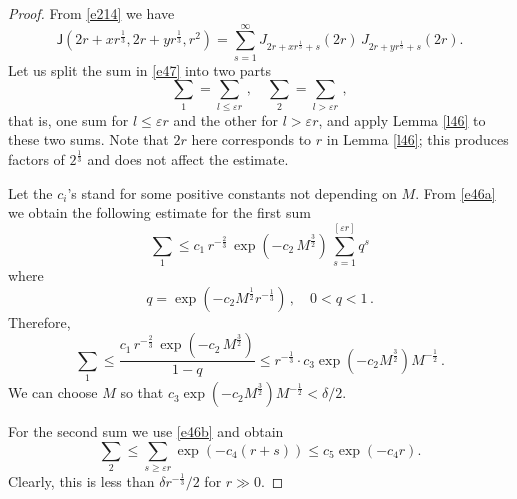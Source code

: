 \documentclass[12pt]{amsart}
\newcommand{\J}{\mathsf{J}}
\theoremstyle{plain}
\theoremstyle{definition}
\numberwithin{equation}{section}
\begin{document}
\begin{proof} From  \eqref{e214} we have 
%
\begin{equation}\label{e47}
\J\left(2r+xr^{\frac 13},2r+yr^{\frac 13}, {r^2} \right)=\sum_{s=1}^\infty 
J_{2r+xr^{\frac 13}+s}(2r)\,J_{2r+yr^{\frac 13}+s}(2r).
\end{equation}
%
Let us split the sum in \eqref{e47}  into two parts
%
\begin{equation*}
{\sum}_1=\sum_{l\le \varepsilon r}\,, \quad  
{\sum}_2=\sum_{l> \varepsilon r}\,,
\end{equation*}
%
that is, one sum for 
$l\le\varepsilon r$ and the other  for $l> \varepsilon r$, and apply
Lemma \ref{l46} to these two sums.  Note that $2r$ 
here corresponds to $r$ in Lemma \ref{l46};  this produces factors of 
$2^{\frac 13}$ and does not affect the estimate. 

Let the $c_i$'s stand for some positive constants not depending on 
$M$. From \eqref{e46a} we obtain the following estimate for the first sum 
$$
{\sum}_1 \le  c_1\, r^{-\frac 23}\,
\exp\left(-c_2\,M^{\frac 32}\right) \, \sum_{s=1}^{[\varepsilon r]} q^s 
$$
where
$$
q=\exp\left(-c_2M^{\frac 12}r^{-\frac 13}\right)\,, \quad 0<q<1\,.
$$
Therefore,
$$
{\sum}_1 \le \frac{c_1\, r^{-\frac 23}\,
\exp\left(-c_2\,M^{\frac 32}\right) }{1-q} \le 
r^{-\frac 13}\cdot c_3\exp(-c_2M^{\frac 32})M^{-\frac 12} \,.
$$
We can choose $M$ so that $c_3\exp(-c_2M^{\frac 32})M^{-\frac 12}<\delta/2$.

For  the second sum we use \eqref{e46b} and obtain  
%
\begin{equation*}
{\sum}_2 \le \sum_{s\ge \varepsilon r} \exp(-c_4 (r+s))\le  c_5\exp(-c_4r).
\end{equation*}
%
Clearly, this is less than $\delta r^{-\frac 13}/2$ for $r\gg0$.
\end{proof}
\end{document}
